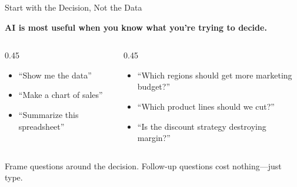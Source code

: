 \documentclass[aspectratio=169]{beamer}
\begin{document}
\begin{frame}{Start with the Decision, Not the Data}
\begin{center}
{\Large\bfseries AI is most useful when you know what you're trying to decide.}
\end{center}

\vspace{0.5cm}

\begin{columns}[T]
\begin{column}{0.45\textwidth}
\begin{shadedbox}[title=\textbf{Weak}]
\begin{itemize}\small
  \item ``Show me the data''
  \item ``Make a chart of sales''
  \item ``Summarize this spreadsheet''
\end{itemize}
\end{shadedbox}
\end{column}
\begin{column}{0.45\textwidth}
\begin{shadedbox}[title=\textbf{Strong}]
\begin{itemize}\small
  \item ``Which regions should get more marketing budget?''
  \item ``Which product lines should we cut?''
  \item ``Is the discount strategy destroying margin?''
\end{itemize}
\end{shadedbox}
\end{column}
\end{columns}

\vspace{0.3cm}
Frame questions around the decision.  Follow-up questions cost nothing---just type.
\end{frame}
\end{document}
